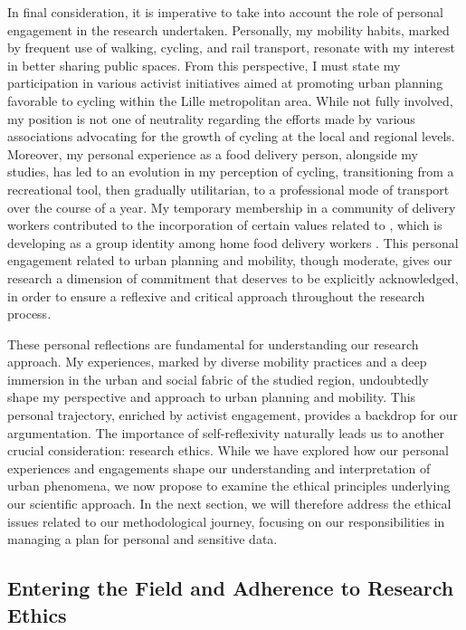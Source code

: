 \begin{refsegment}
In final consideration, it is imperative to take into account the role of personal engagement in the research undertaken. Personally, my mobility habits, marked by frequent use of walking, cycling, and rail transport, resonate with my interest in better sharing public spaces. From this perspective, I must state my participation in various activist initiatives aimed at promoting urban planning favorable to cycling within the Lille metropolitan area. While not fully involved, my position is not one of neutrality regarding the efforts made by various associations advocating for the growth of cycling at the local and regional levels. Moreover, my personal experience as a food delivery person, alongside my studies, has led to an evolution in my perception of cycling, transitioning from a recreational tool, then gradually utilitarian, to a professional mode of transport over the course of a year. My temporary membership in a community of delivery workers contributed to the incorporation of certain values related to , which is developing as a group identity among home food delivery workers \textcolor{blue}{\autocite[10]{jan_livrer_2018}}. This personal engagement related to urban planning and mobility, though moderate, gives our research a dimension of commitment that deserves to be explicitly acknowledged, in order to ensure a reflexive and critical approach throughout the research process.%

These personal reflections are fundamental for understanding our research approach. My experiences, marked by diverse mobility practices and a deep immersion in the urban and social fabric of the studied region, undoubtedly shape my perspective and approach to urban planning and mobility. This personal trajectory, enriched by activist engagement, provides a backdrop for our argumentation. The importance of self-reflexivity naturally leads us to another crucial consideration: research ethics. While we have explored how our personal experiences and engagements shape our understanding and interpretation of urban phenomena, we now propose to examine the ethical principles underlying our scientific approach. In the next section, we will therefore address the ethical issues related to our methodological journey, focusing on our responsibilities in managing a plan for personal and sensitive data.%

\subsection{Entering the Field and Adherence to Research Ethics
    \label{chap3:preparation-terrain-geographique}
    }


\end{refsegment}
